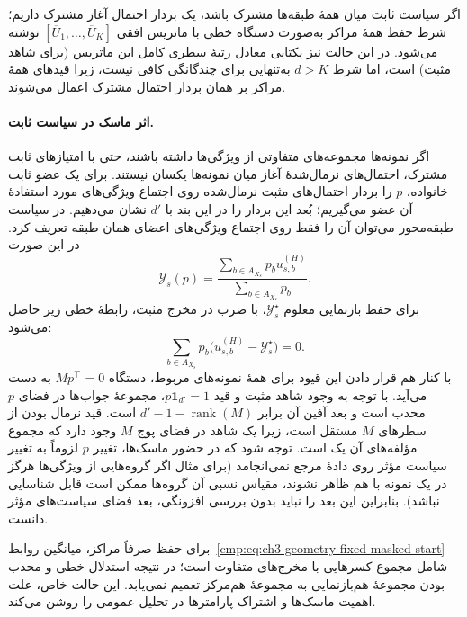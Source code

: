 اگر سیاست ثابت میان همهٔ طبقه‌ها مشترک باشد، یک بردار احتمال آغاز مشترک داریم؛ شرط حفظ همهٔ مراکز به‌صورت دستگاه خطی با ماتریس افقی $[\overline U_1,\ldots,\overline U_K]$ نوشته می‌شود. در این حالت نیز یکتایی معادل رتبهٔ سطری کامل این ماتریس (برای شاهد مثبت) است، اما شرط $d>K$ به‌تنهایی برای چندگانگی کافی نیست، زیرا قیدهای همهٔ مراکز بر همان بردار احتمال مشترک اعمال می‌شوند.

\paragraph{اثر ماسک در سیاست ثابت.}
اگر نمونه‌ها مجموعه‌های متفاوتی از ویژگی‌ها داشته باشند، حتی با امتیازهای ثابت مشترک، احتمال‌های نرمال‌شدهٔ آغاز میان نمونه‌ها یکسان نیستند. برای یک عضو ثابت خانواده، $p$ را بردار احتمال‌های مثبت نرمال‌شده روی اجتماع ویژگی‌های مورد استفادهٔ آن عضو می‌گیریم؛ بُعد این بردار را در این بند با $d'$ نشان می‌دهیم. در سیاست طبقه‌محور می‌توان آن را فقط روی اجتماع ویژگی‌های اعضای همان طبقه تعریف کرد. در این صورت
\begin{equation}\label{cmp:eq:ch3-geometry-fixed-masked-start}
\mathscr Y_s(p)=\frac{\sum_{b\in A_{X_s}}p_b u_{s,b}^{(H)}}{\sum_{b\in A_{X_s}}p_b}.
\end{equation}
برای حفظ بازنمایی معلوم $\mathscr Y_s^\star$، با ضرب در مخرج مثبت، رابطهٔ خطی زیر حاصل می‌شود:
\begin{equation}\label{cmp:eq:ch3-geometry-fixed-masked-representation-fiber}
\sum_{b\in A_{X_s}}p_b\bigl(u_{s,b}^{(H)}-\mathscr Y_s^\star\bigr)=0.
\end{equation}
با کنار هم قرار دادن این قیود برای همهٔ نمونه‌های مربوط، دستگاه $Mp^\top=0$ به دست می‌آید. با توجه به وجود شاهد مثبت و قید $p\mathbf1_{d'}=1$، مجموعهٔ جواب‌ها در فضای $p$ محدب است و بعد آفین آن برابر $d'-1-\operatorname{rank}(M)$ است. قید نرمال بودن از سطرهای $M$ مستقل است، زیرا یک شاهد در فضای پوچ $M$ وجود دارد که مجموع مؤلفه‌های آن یک است. توجه شود که در حضور ماسک‌ها، تغییر $p$ لزوماً به تغییر سیاست مؤثر روی دادهٔ مرجع نمی‌انجامد (برای مثال اگر گروه‌هایی از ویژگی‌ها هرگز در یک نمونه با هم ظاهر نشوند، مقیاس نسبی آن گروه‌ها ممکن است قابل شناسایی نباشد). بنابراین این بعد را نباید بدون بررسی افزونگی، بعد فضای سیاست‌های مؤثر دانست.

برای حفظ صرفاً مراکز، میانگین روابط~\eqref{cmp:eq:ch3-geometry-fixed-masked-start} شامل مجموع کسرهایی با مخرج‌های متفاوت است؛ در نتیجه استدلال خطی و محدب بودن مجموعهٔ هم‌بازنمایی به مجموعهٔ هم‌مرکز تعمیم نمی‌یابد. این حالت خاص، علت اهمیت ماسک‌ها و اشتراک پارامترها در تحلیل عمومی را روشن می‌کند.

